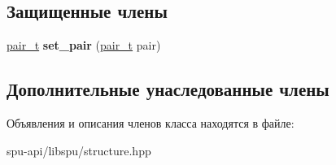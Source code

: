 \subsection*{Защищенные члены}
\begin{DoxyCompactItemize}
\item 
\mbox{\label{class_s_p_u_1_1_structure_ade8084a87ca74a587af1d8650347c682}} 
\hyperlink{struct_s_p_u_1_1pair__containter}{pair\+\_\+t} {\bfseries set\+\_\+pair} (\hyperlink{struct_s_p_u_1_1pair__containter}{pair\+\_\+t} pair)
\end{DoxyCompactItemize}
\subsection*{Дополнительные унаследованные члены}


Объявления и описания членов класса находятся в файле\+:\begin{DoxyCompactItemize}
\item 
spu-\/api/libspu/structure.\+hpp\end{DoxyCompactItemize}
